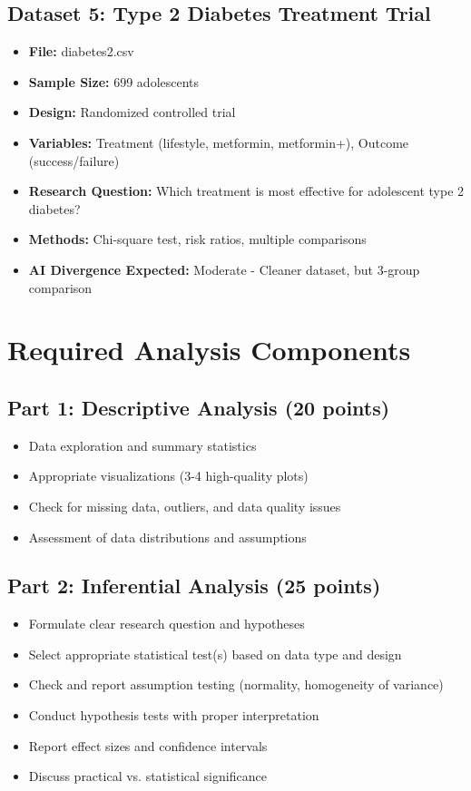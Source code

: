 \documentclass[11pt]{article}
\begin{document}
\subsection{Dataset 5: Type 2 Diabetes Treatment Trial}
\begin{itemize}
\item \textbf{File:} diabetes2.csv
\item \textbf{Sample Size:} 699 adolescents
\item \textbf{Design:} Randomized controlled trial
\item \textbf{Variables:} Treatment (lifestyle, metformin, metformin+), Outcome (success/failure)
\item \textbf{Research Question:} Which treatment is most effective for adolescent type 2 diabetes?
\item \textbf{Methods:} Chi-square test, risk ratios, multiple comparisons
\item \textbf{AI Divergence Expected:} Moderate - Cleaner dataset, but 3-group comparison
\end{itemize}

\section{Required Analysis Components}

\subsection{Part 1: Descriptive Analysis (20 points)}
\begin{itemize}
\item Data exploration and summary statistics
\item Appropriate visualizations (3-4 high-quality plots)
\item Check for missing data, outliers, and data quality issues
\item Assessment of data distributions and assumptions
\end{itemize}

\subsection{Part 2: Inferential Analysis (25 points)}
\begin{itemize}
\item Formulate clear research question and hypotheses
\item Select appropriate statistical test(s) based on data type and design
\item Check and report assumption testing (normality, homogeneity of variance)
\item Conduct hypothesis tests with proper interpretation
\item Report effect sizes and confidence intervals
\item Discuss practical vs. statistical significance
\end{itemize}
\end{document}
